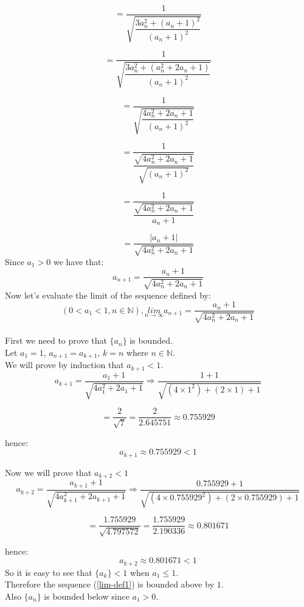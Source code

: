 \documentclass[12pt, letterpaper, oneside]{report}
\begin{document}
\[
=\dfrac{1}{\sqrt{ \dfrac{ 3 a_{ n }^{2}+( a_{ n }+1 )^{2} }{ ( a_{n}+1 )^{2} } } }
\]

\[ =\dfrac{1}{ \sqrt{ \dfrac{ 3a_{ n }^{ 2 }+( a_{ n }^2 + 2 a_{ n }+1 ) }{ ( a_{ n }+1 )^{ 2 } } } }
\]

\[
=\dfrac{ 1 }{\sqrt{\dfrac{4a_{n}^{2}+2a_{n}+1}{(a_{n}+1)^{2}}}}
\]

\[
=\dfrac{1}{\dfrac{ \sqrt{4a_{n}^{2}+2a_{n}+1} }{ \sqrt{(a_{n}+1)^{2}} } }
\]

\[
=\dfrac{ 1 }{ \dfrac{ \sqrt{ 4 a_{ n }^{ 2 } + 2 a_{ n } + 1 } }{ a_{ n } + 1 } }
\]

\[
=\dfrac{ | a_{n}+1 | }{ \sqrt{ 4 a_{ n }^{ 2 } + 2 a_{ n }+1} }
\]
Since ${ a_1 > 0 }$ we have that:
\[
a_{ n + 1 }=\dfrac{ a_{ n } + 1 }{ \sqrt{ 4 a_{ n }^{ 2 } + 2 a_{ n } + 1} }
\]
Now let's evaluate the limit of the sequence defined by: 
\begin{equation}\label{lim-def1}
(0 < a_{ 1 } < 1, n \in \mathbb N), \label{lim} 
\underset{ n \to \infty }{lim} a_{ n+1 }=\dfrac{ a_{ n } + 1 }{ \sqrt{4 a_{ n }^{2} + 2 a_{n} + 1 } }
\end{equation}
\\
First we need to prove that $\{a_{n}\}$ is bounded. 
\\
Let $ a_{ 1 } = 1 $, $ a_{ n + 1 } = a_{k+1}$, $ k = n $ where $n \in \mathbb N$.
\\
We will prove by induction that $ a_{k + 1} < 1$.
\[
a_{k+1} =\dfrac{ a_{ 1 } + 1 }{ \sqrt{4 a_{ 1 }^{2} + 2 a_{1} + 1 } } \Rightarrow \dfrac{ 1 + 1 }{\sqrt{(4\times 1^{2})+(2\times 1)+1}}
\]

\[
= \dfrac{ 2 }{  \sqrt{ 7 } } = \dfrac{2}{2.645751} \approx 0.755929
\]

hence:
\[
a_{k+1} \approx 0.755929 < 1 
\]

Now we will prove that $ a_{ k + 2 } < 1 $
\[
a_{k + 2}=\dfrac{ a_{ k+1 } + 1 }{ \sqrt{ 4 a_{ k+1 }^{ 2 } + 2 a_{ k+1 } + 1} } \Rightarrow \dfrac{ 0.755929 + 1 }{  \sqrt{ (4\times 0.755929^{2} ) + ( 2\times 0.755929 ) + 1 } }
\]

\[
= \dfrac{ 1.755929 }{  \sqrt{4.797572}} = \dfrac{1.755929}{2.190336} \approx 0.801671 
\]

hence: \[ a_{k+2} \approx 0.801671 < 1 \]
So it is easy to see that $\{a_{k}\} < 1$ when $ a_{1} \le 1$.
\\
Therefore the sequence (\ref{lim-def1}) is bounded above by $1$.
\\
Also ${\{a_{n}\}}$ is bounded below since $a_{1} > 0 $.
\end{document}
